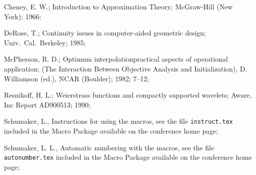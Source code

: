  Cheney,  E. W.;
Introduction to Approximation Theory;
McGraw-Hill (New York); 1966;

 DeRose,  T.;
Continuity issues in computer-aided geometric design;
Univ.~Cal.~Berkeley; 1985;

 McPherson,  R. D.;
Optimum interpolation\semicolon practical aspects of
operational application;
(The Interaction Between Objective Analysis and Initialization),
D. Williamson (ed.),  NCAR (Boulder); 1982; 7--12;

 Resnikoff,  H. L.;
Weierstrass functions and compactly supported wavelets;
Aware, Inc Report AD900513; 1990;

 Schumaker, L.,
Instructions for using the \conf \noexpand\Tex macros,
see the \noexpand\Tex \noexpand\break file {\noexpand\tt instruct.tex}
included in the \conf Macro Package
available on the conference home page;

  Schumaker, L. L.,
Automatic numbering with the \conf macros,
see the \noexpand\Tex file {\noexpand\tt autonumber.tex}
included in the \conf Macro Package
available on the conference home page;

\endbib



\bye

